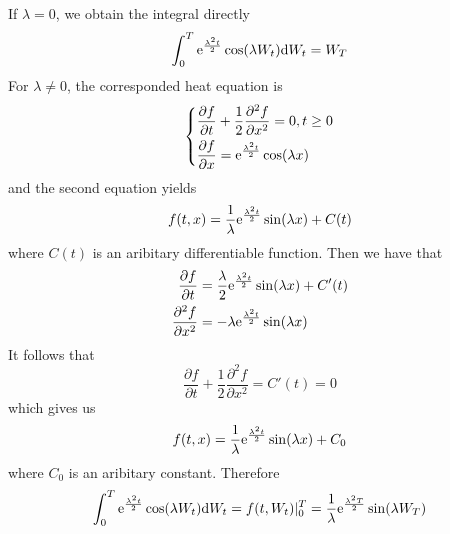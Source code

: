 \documentclass{homework}
\begin{document}
\begin{subproblem}[(\alph*)]
        \item
        If $\lambda=0$, we obtain the integral directly
        \newcommand{\thisf}[1]{\e^{\frac{\lambda^2t}2}\cos(\lambda #1)}
        \[\int_0^T\thisf{W_t}\diff W_t=W_T\]
        For $\lambda\neq 0$,
        the corresponded heat equation is
        \[\left\{\begin{aligned}
            &\frac{\partial f}{\partial t}+\frac{1}{2}\frac{\partial^2 f}{\partial x^2}=0,t\geq 0\\
            &\frac{\partial f}{\partial x}=\thisf{x}
        \end{aligned}\right.\]
        and the second equation yields
        \[f(t,x)=\frac{1}{\lambda}\mathrm e^{\frac{\lambda^2t}{2}}\sin(\lambda x)+C(t)\]
        where $C(t)$ is an aribitary differentiable function. Then we have that
        \[\begin{aligned}
            \frac{\partial f}{\partial t}
            &=\frac{\lambda}{2}\mathrm e^{\frac{\lambda^2t}{2}}\sin(\lambda x)+C'(t)\\
            \frac{\partial^2 f}{\partial x^2}
            &=-\lambda\mathrm e^{\frac{\lambda^2t}{2}}\sin(\lambda x)\\
        \end{aligned}\]
        It follows that
        \[\frac{\partial f}{\partial t}+\frac{1}{2}\frac{\partial^2 f}{\partial x^2}
        =C'(t)=0\]
        which gives us
        \[f(t,x)=\frac{1}{\lambda}\mathrm e^{\frac{\lambda^2t}{2}}\sin(\lambda x)+C_0\]
        where $C_0$ is an aribitary constant.
        Therefore
        \[\int_0^T\thisf{W_t}\diff W_t=f(t,W_t)|_0^T
        =\frac{1}{\lambda}\e^{\frac{\lambda^2T}{2}}\sin(\lambda W_T)\]


\end{subproblem}
\end{document}
